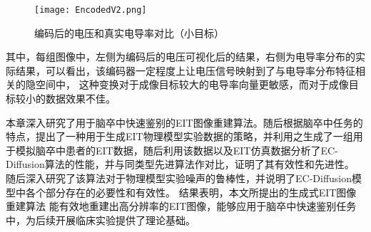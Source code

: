 \begin{figure}[H]
    \centering
    \texttt{[image: EncodedV2.png]}
    \caption{编码后的电压和真实电导率对比（小目标）}
    \label{figure:EncodedV2}
\end{figure}

其中，每组图像中，左侧为编码后的电压可视化后的结果，右侧为电导率分布的实际结果，可以看出，该编码器一定程度上让电压信号映射到了与电导率分布特征相关的隐空间中，
这种变换对于成像目标较大的电导率向量更敏感，而对于成像目标较小的数据效果不佳。
 







本章深入研究了用于脑卒中快速鉴别的EIT图像重建算法。随后根据脑卒中任务的特点，提出了一种用于生成EIT物理模型实验数据的策略，并利用之生成了一组用于模拟脑卒中患者的EIT数据，随后利用该数据以及EIT仿真数据分析了EC-Diffusion算法的性能，并与同类型先进算法作对比，证明了其有效性和先进性。
随后深入研究了该算法对于物理模型实验噪声的鲁棒性，并说明了EC-Diffusion模型中各个部分存在的必要性和有效性。
结果表明，本文所提出的生成式EIT图像重建算法
能有效地重建出高分辨率的EIT图像，能够应用于脑卒中快速鉴别任务中，为后续开展临床实验提供了理论基础。
